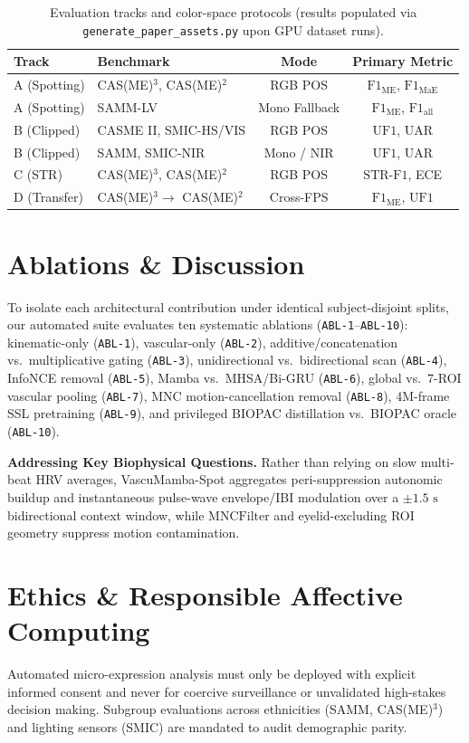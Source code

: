 \documentclass[10pt,twocolumn,letterpaper]{article}
\begin{document}
\begin{table}[t]
\centering
\caption{Evaluation tracks and color-space protocols (results populated via \texttt{generate\_paper\_assets.py} upon GPU dataset runs).}
\label{tab:protocol}
\small
\begin{tabular}{llcc}
\toprule
Track & Benchmark & Mode & Primary Metric \\
\midrule
A (Spotting) & CAS(ME)$^3$, CAS(ME)$^2$ & RGB POS & $\mathrm{F1}_{\mathrm{ME}}$, $\mathrm{F1}_{\mathrm{MaE}}$ \\
A (Spotting) & SAMM-LV & Mono Fallback & $\mathrm{F1}_{\mathrm{ME}}$, $\mathrm{F1}_{\mathrm{all}}$ \\
B (Clipped) & CASME II, SMIC-HS/VIS & RGB POS & $\mathrm{UF1}$, $\mathrm{UAR}$ \\
B (Clipped) & SAMM, SMIC-NIR & Mono / NIR & $\mathrm{UF1}$, $\mathrm{UAR}$ \\
C (STR) & CAS(ME)$^3$, CAS(ME)$^2$ & RGB POS & $\mathrm{STR\text{-}F1}$, ECE \\
D (Transfer) & CAS(ME)$^3 \!\to$ CAS(ME)$^2$ & Cross-FPS & $\mathrm{F1}_{\mathrm{ME}}$, $\mathrm{UF1}$ \\
\bottomrule
\end{tabular}
\end{table}

\section{Ablations \& Discussion}
To isolate each architectural contribution under identical subject-disjoint splits, our automated suite evaluates ten systematic ablations (\texttt{ABL-1}--\texttt{ABL-10}): kinematic-only (\texttt{ABL-1}), vascular-only (\texttt{ABL-2}), additive/concatenation vs.\ multiplicative gating (\texttt{ABL-3}), unidirectional vs.\ bidirectional scan (\texttt{ABL-4}), InfoNCE removal (\texttt{ABL-5}), Mamba vs.\ MHSA/Bi-GRU (\texttt{ABL-6}), global vs.\ 7-ROI vascular pooling (\texttt{ABL-7}), MNC motion-cancellation removal (\texttt{ABL-8}), 4M-frame SSL pretraining (\texttt{ABL-9}), and privileged BIOPAC distillation vs.\ BIOPAC oracle (\texttt{ABL-10}).

\textbf{Addressing Key Biophysical Questions.} Rather than relying on slow multi-beat HRV averages, VascuMamba-Spot aggregates peri-suppression autonomic buildup and instantaneous pulse-wave envelope/IBI modulation over a $\pm 1.5\text{ s}$ bidirectional context window, while $\mathrm{MNCFilter}$ and eyelid-excluding ROI geometry suppress motion contamination.

\section{Ethics \& Responsible Affective Computing}
Automated micro-expression analysis must only be deployed with explicit informed consent and never for coercive surveillance or unvalidated high-stakes decision making. Subgroup evaluations across ethnicities (SAMM, CAS(ME)$^3$) and lighting sensors (SMIC) are mandated to audit demographic parity.



\end{document}
